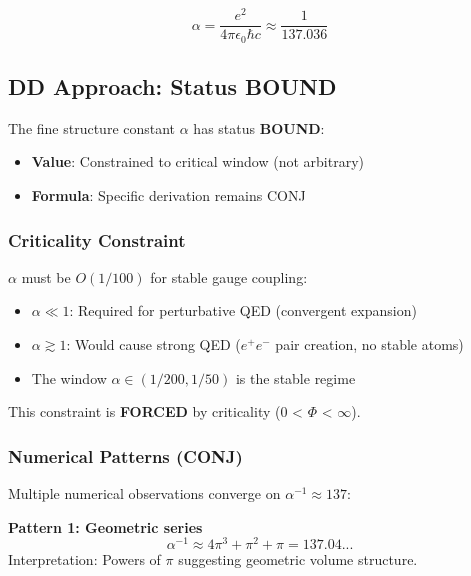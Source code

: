 \begin{equation}
\alpha = \frac{e^2}{4\pi\epsilon_0 \hbar c} \approx \frac{1}{137.036}
\end{equation}

\subsection{DD Approach: Status BOUND}

The fine structure constant $\alpha$ has status \textbf{BOUND}:
\begin{itemize}
    \item \textbf{Value}: Constrained to critical window (not arbitrary)
    \item \textbf{Formula}: Specific derivation remains CONJ
\end{itemize}

\subsubsection{Criticality Constraint}

\begin{theorem}
$\alpha$ must be $O(1/100)$ for stable gauge coupling:
\begin{itemize}
    \item $\alpha \ll 1$: Required for perturbative QED (convergent expansion)
    \item $\alpha \gtrsim 1$: Would cause strong QED ($e^+e^-$ pair creation, no stable atoms)
    \item The window $\alpha \in (1/200, 1/50)$ is the stable regime
\end{itemize}
\end{theorem}

This constraint is \textbf{FORCED} by criticality (0 < $\Phi$ < $\infty$).

\subsubsection{Numerical Patterns (CONJ)}

Multiple numerical observations converge on $\alpha^{-1} \approx 137$:

\textbf{Pattern 1: Geometric series}
\begin{equation}
\alpha^{-1} \approx 4\pi^3 + \pi^2 + \pi = 137.04...
\end{equation}
Interpretation: Powers of $\pi$ suggesting geometric volume structure.

